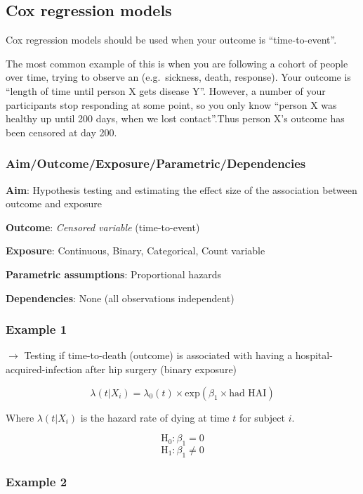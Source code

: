 \documentclass[12pt,]{article}
\begin{document}
\newpage

\subsection{Cox regression models}\label{cox-regression-models}

Cox regression models should be used when your outcome is
``time-to-event''.

The most common example of this is when you are following a cohort of
people over time, trying to observe an (e.g.~sickness, death, response).
Your outcome is ``length of time until person X gets disease Y''.
However, a number of your participants stop responding at some point, so
you only know ``person X was healthy up until 200 days, when we lost
contact''.Thus person X's outcome has been censored at day 200.

\subsubsection{Aim/Outcome/Exposure/Parametric/Dependencies}\label{aimoutcomeexposureparametricdependencies-8}

\textbf{Aim}: Hypothesis testing and estimating the effect size of the
association between outcome and exposure

\textbf{Outcome}: \emph{Censored variable} (time-to-event)

\textbf{Exposure}: Continuous, Binary, Categorical, Count variable

\textbf{Parametric assumptions}: Proportional hazards

\textbf{Dependencies}: None (all observations independent)

\subsubsection{Example 1}\label{example-1-9}

\(\rightarrow\) Testing if time-to-death (outcome) is associated with
having a hospital-acquired-infection after hip surgery (binary exposure)

\[\lambda(t | X_i) = \lambda_0(t) \times \text{exp}(\beta_1 \times \text{had HAI})\]

Where \(\lambda(t | X_i)\) is the hazard rate of dying at time \(t\) for
subject \(i\).

\[\text{H}_0: \beta_1 = 0\] \[\text{H}_1: \beta_1 \ne 0\]

\subsubsection{Example 2}\label{example-2-9}
\end{document}
